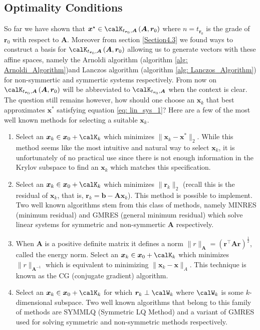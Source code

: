 \subsection{Optimality Conditions}\label{Section4.4}

So far we have shown that $\bm{x}^{\star} \in \calK_{t_{\bm{r}_0}, \bm{A}} \left( \bm{A}, \bm{r}_0 \right)$ where $n = t_{\bm{r}_0}$ is the grade of $\bm{r}_0$ with respect to $\bm{A}$. Moreover from section \ref{Section4.3} we found ways to construct a basis for $\calK_{t_{\bm{r}_0}, \bm{A}} \left( \bm{A}, \bm{r}_0 \right)$ allowing us to generate vectors with these affine spaces, namely the Arnoldi algorithm (algorithm \ref{alg: Arnoldi_Algorithm})and Lanczos algorithm (algorithm \ref{alg: Lanczos_Algorithm}) for non-symmertic and symmertic systems respectively. From now on $\calK_{t_{\bm{r}_0}, \bm{A}} \left( \bm{A}, \bm{r}_0 \right)$ will be abbreviated to $\calK_{t_{\bm{r}_0}, \bm{A}}$ when the context is clear. The question still remains however, how should one choose an $\bm{x}_k$ that best approximates $\bm{x}^{\ast}$ satisfying equation \ref{eq: lin_sys_1}? Here are a few of the most well known methods for selecting a suitable $\bm{x}_k$.

\begin{enumerate}

    \item Select an $\bm{x}_k \in \bm{x}_0 + \calK_k$ which minimizes $\| \bm{x}_k - \bm{x}^{\ast} \|_2$. While this method seems like the most intuitive and natural way to select $\bm{x}_k$, it is unfortunately of no practical use since there is not enough information in the Krylov subspace to find an $\bm{x}_k$ which matches this specification.

    \item Select an $\bm{x}_k \in \bm{x}_0 + \calK_k$ which minimizes $\| \bm{r}_k \|_2$ (recall this is the residual of $\bm{x}_k$, that is, $\bm{r}_k = \bm{b} - \bm{A} \bm{x}_k$). This method is possible to implement. Two well known algorithms stem from this class of methods, namely MINRES (minimum residual) and GMRES (general minimum residual) which solve linear systems for symmetric and non-symmertic $\bm{A}$ respectively.

    \item When $\bm{A}$ is a positive definite matrix it defines a norm $\| r \|_{\bm{A}} = \left( \bm{r}^{\intercal} \bm{A} \bm{r} \right)^{\frac{1}{2}}$, called the energy norm. Select an $\bm{x}_k \in \bm{x}_0 + \calK_k$ which minimizes $\| r \|_{\bm{A}^{-1}}$ which is equivalent to minimizing $\| \bm{x}_k - \bm{x} \|_{A}$. This technique is known as the CG (conjugate gradient) algorithm.

    \item Select an $\bm{x}_k \in \bm{x}_0 + \calK_k$ for which $\bm{r}_{k} \perp \calW_k$ where $\calW_k$ is some $k$-dimensional subspace. Two well known algorithms that belong to this family of methods are SYMMLQ (Symmetric LQ Method) and a variant of GMRES used for solving symmetric and non-symmetric methods respectively.

\end{enumerate}

